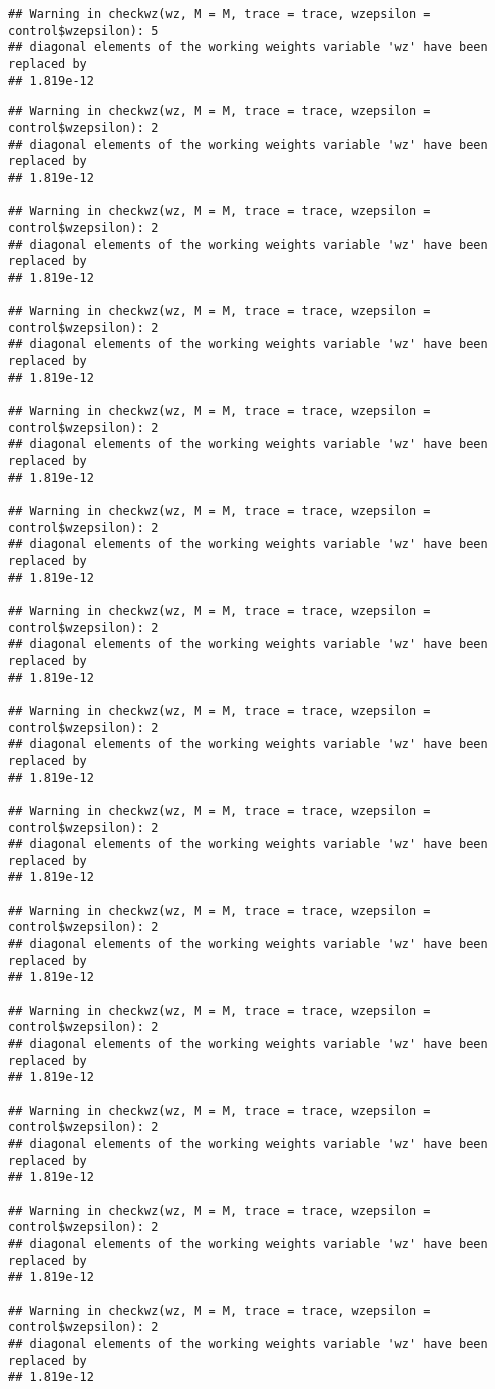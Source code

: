 \documentclass[
]{article}
\begin{document}
\begin{verbatim}
## Warning in checkwz(wz, M = M, trace = trace, wzepsilon = control$wzepsilon): 5
## diagonal elements of the working weights variable 'wz' have been replaced by
## 1.819e-12
\end{verbatim}

\begin{verbatim}
## Warning in checkwz(wz, M = M, trace = trace, wzepsilon = control$wzepsilon): 2
## diagonal elements of the working weights variable 'wz' have been replaced by
## 1.819e-12

## Warning in checkwz(wz, M = M, trace = trace, wzepsilon = control$wzepsilon): 2
## diagonal elements of the working weights variable 'wz' have been replaced by
## 1.819e-12

## Warning in checkwz(wz, M = M, trace = trace, wzepsilon = control$wzepsilon): 2
## diagonal elements of the working weights variable 'wz' have been replaced by
## 1.819e-12

## Warning in checkwz(wz, M = M, trace = trace, wzepsilon = control$wzepsilon): 2
## diagonal elements of the working weights variable 'wz' have been replaced by
## 1.819e-12

## Warning in checkwz(wz, M = M, trace = trace, wzepsilon = control$wzepsilon): 2
## diagonal elements of the working weights variable 'wz' have been replaced by
## 1.819e-12

## Warning in checkwz(wz, M = M, trace = trace, wzepsilon = control$wzepsilon): 2
## diagonal elements of the working weights variable 'wz' have been replaced by
## 1.819e-12

## Warning in checkwz(wz, M = M, trace = trace, wzepsilon = control$wzepsilon): 2
## diagonal elements of the working weights variable 'wz' have been replaced by
## 1.819e-12

## Warning in checkwz(wz, M = M, trace = trace, wzepsilon = control$wzepsilon): 2
## diagonal elements of the working weights variable 'wz' have been replaced by
## 1.819e-12

## Warning in checkwz(wz, M = M, trace = trace, wzepsilon = control$wzepsilon): 2
## diagonal elements of the working weights variable 'wz' have been replaced by
## 1.819e-12

## Warning in checkwz(wz, M = M, trace = trace, wzepsilon = control$wzepsilon): 2
## diagonal elements of the working weights variable 'wz' have been replaced by
## 1.819e-12

## Warning in checkwz(wz, M = M, trace = trace, wzepsilon = control$wzepsilon): 2
## diagonal elements of the working weights variable 'wz' have been replaced by
## 1.819e-12

## Warning in checkwz(wz, M = M, trace = trace, wzepsilon = control$wzepsilon): 2
## diagonal elements of the working weights variable 'wz' have been replaced by
## 1.819e-12

## Warning in checkwz(wz, M = M, trace = trace, wzepsilon = control$wzepsilon): 2
## diagonal elements of the working weights variable 'wz' have been replaced by
## 1.819e-12
\end{verbatim}
\end{document}
